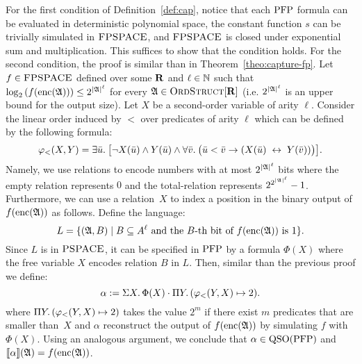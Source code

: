 For the first condition of Definition~\ref{def:cap}, notice that each ${\rm PFP}$ formula can be evaluated in deterministic polynomial space, the constant function $s$ can be trivially simulated in $\text{\sc FPSPACE}$, and $\text{\sc FPSPACE}$ is closed under exponential sum and multiplication. This suffices to show that the condition holds.
For the second condition, the proof is similar than in Theorem~\ref{theo:capture-fp}. Let $f\in \text{\sc FPSPACE}$ defined over some $\mathbf{R}$ and $\ell\in\mathbb{N}$ such that $\log_2\left( f({\rm enc}(\mathfrak{A})) \right) \leq 2^{{|\mathfrak{A}|}^\ell}$ for every $\mathfrak{A}\in\text{\sc OrdStruct}[\mathbf{R}]$  (i.e. $2^{{|\mathfrak{A}|}^\ell}$ is an upper bound for the output size). Let $X$ be a second-order variable of arity $\ell$. Consider the linear order induced by $<$ over predicates of arity $\ell$ which can be defined by the following formula:
$$
\varphi_{<}(X,Y) = \exists{\bar{u}}.\:\big[\neg X(\bar{u})\wedge Y(\bar{u})\wedge \forall{\bar{v}}.\:\big(
\bar{u}<\bar{v}\to(X(\bar{u})\;\leftrightarrow\; Y(\bar{v}))\big)\big].
$$
Namely, we use relations to encode numbers with at most $2^{{|\mathfrak{A}|}^\ell}$ bits where the empty relation represents $0$ and the total-relation represents $2^{2^{{|\mathfrak{A}|}^\ell}}-1$.
Furthermore, we can use a relation~$X$ to index a position in the binary output of $f({\rm enc}(\mathfrak{A}))$ as follows.
Define the language:
\[
L = \{(\mathfrak{A},B)\mid B \subseteq A^{\ell}\text{ and the $B$-th bit of $f({\rm enc}(\mathfrak{A}))$ is 1}\}.
\]
Since $L$ is in $\text{\sc PSPACE}$, it can be specified in ${\rm PFP}$ \cite{AbiteboulV89} by a formula $\Phi(X)$ where the free variable $X$ encodes relation $B$ in $L$. Then, similar than the previous proof we define:
$$
\alpha := \Sigma{X}.\, \Phi(X)\cdot  \Pi{Y}.\,(\varphi_{<}(Y,X)\mapsto 2).
$$ 
where $\Pi{Y}.\,(\varphi_{<}(Y,X)\mapsto 2)$ takes the value $2^m$ if there exist $m$ predicates that are smaller than~$X$ and $\alpha$ reconstruct the output of $f({\rm enc}(\mathfrak{A}))$ by simulating $f$ with $\Phi(X)$. Using an analogous argument, we conclude that $\alpha\in{\rm QSO}({\rm PFP})$ and ${\llbracket{}{\alpha}\rrbracket}(\mathfrak{A}) = f({\rm enc}(\mathfrak{A}))$.
